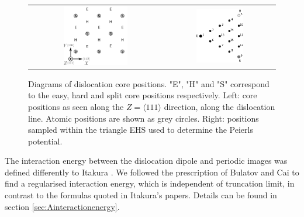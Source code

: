 \documentclass[a4paper,11pt]{article}
\begin{document}
        \begin{figure}
    \begin{tabular}{cc}
	     \includegraphics[width=0.5\textwidth]{Images/hardeasycoreatomdiagram_coordnew.png} &
             \includegraphics[width=0.45\textwidth]{Images/peierls_potential_positions_tbe.png}  \\
    \end{tabular}
\caption{Diagrams of dislocation core positions. "E", "H" and "S" correspond to the easy, hard and split core positions respectively. Left: core positions as seen along the $Z=\langle 111 \rangle$ direction, along the dislocation line. Atomic positions are shown as grey circles. Right: positions sampled within the triangle EHS used to determine the Peierls potential.  \label{sampledpositions}}
	\label{fig:peierlspot}
    \end{figure}


The interaction energy between the dislocation dipole and periodic images was defined differently
to Itakura \cite{Itakura2012}. We followed the prescription of Bulatov and Cai \cite{vasilybulatov2006} to
find a regularised interaction energy, which is independent of truncation limit, in contrast to
the formulas quoted in Itakura's papers. Details can be found in section \ref{sec:Ainteractionenergy}.
\end{document}
